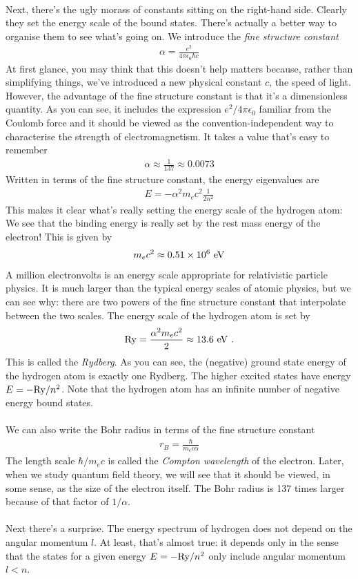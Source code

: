 \documentclass[12pt]{article}
\def\be{\begin{eqnarray}}
\def\ee{\end{eqnarray}}
\newcommand{\nn}{\nonumber}
\newcommand\para{\paragraph{}}
\newcommand{\co}{\color{olive}}
\begin{document}
{\para
Next, there's the ugly morass of constants sitting on the right-hand side.  Clearly they set the energy scale of the bound states. There's actually a better way to organise them to see what's going on.  {\co We introduce the {\it fine structure constant}
%
\be \alpha = \frac{e^2}{4\pi \epsilon_0 \hbar c}\nn\ee
%
}
At first glance, you may think that this doesn't help matters because, rather than simplifying things, we've introduced  a new physical constant $c$, the speed of light. However, the advantage of the fine structure constant is that it's a dimensionless quantity. As you can see, it includes the expression  $e^2/4\pi \epsilon_0$ familiar from the  Coulomb force and it should be viewed as the convention-independent way to characterise the strength of electromagnetism. {\co It takes a value that's easy to remember
%
\be \alpha \approx \frac{1}{137} \approx 0.0073\nn\ee
%
Written in terms of the fine structure constant, the energy eigenvalues are
%
\be E = -\alpha^2 m_ec^2\frac{1}{2n^2}\nn\ee
%
}
This makes it clear what's really setting the energy scale of the hydrogen atom: {\co We see that the  binding energy is really set by the rest mass energy of the electron! This is given by
%
\be m_ec^2 \approx 0.51 \times 10^6 \ {\rm eV}\nn\ee
%
}
A million electronvolts is an  energy scale appropriate for  relativistic particle physics. It is  much larger than the typical energy scales of atomic physics, but we can see why: there are two powers of the fine structure constant that interpolate between the two scales. {\co The energy scale of the hydrogen atom is set by
%
\be {\rm Ry} = \frac{\alpha^2 m_ec^2}{2} \approx 13.6\ {\rm eV}\ .\nn\ee
%
This is called the {\it Rydberg}.} As you can see, the (negative) ground state energy of the hydrogen atom is exactly one Rydberg. {\co The higher excited states have energy $E = -{\rm Ry}/n^2$.} Note that the hydrogen atom has an infinite number of negative energy bound states.

\para
{\co
We can also write the Bohr radius  in terms of the fine structure constant
%
\be r_B  =\frac{\hbar}{m_e c\alpha} \nn\ee
%
The length scale $\hbar/m_e c$ is called the {\it Compton wavelength} of the electron.} Later, when we study quantum field theory, we will see that it should be viewed, in some sense, as the size of the electron itself. The Bohr radius is 137 times larger because of that factor of $1/\alpha$. 

\para
Next there's a surprise. The energy spectrum of hydrogen does not depend on the angular momentum $l$. At least, that's almost true: it depends only in the sense that the states for a given energy $E=-{\rm Ry}/n^2$ only include angular momentum $l<n$. 

}
\end{document}
